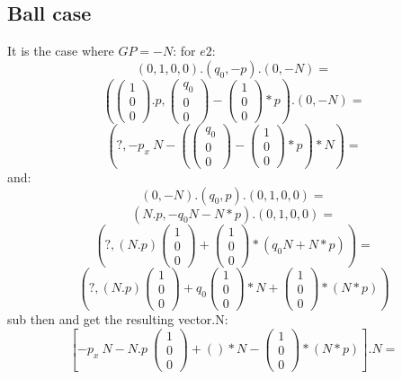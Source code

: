 \subsection{Ball case}
It is the case where $GP=-N$:
for $e2$:
\[(0,1,0,0).(q_0,-p).(0,-N)=\]
\[\left(\left(\begin{array}{c}1\\0\\0\end{array}\right).p,\left(\begin{array}{c}q_0\\0\\0\end{array}\right) -\left(\begin{array}{c}1\\0\\0\end{array}\right)*p \right).(0,-N)=\]
\[\left(?, -p_x~N-\left(\left(\begin{array}{c}q_0\\0\\0\end{array}\right)- \left(\begin{array}{c}1\\0\\0\end{array}\right)*p \right)*N\right)=\]
and:
\[(0,-N).(q_0,p).(0,1,0,0)=\]
\[(N.p,-q_0N-N*p).(0,1,0,0)=\]
\[\left(?,(N.p)\left(\begin{array}{c}1\\0\\0\end{array}\right) + \left(\begin{array}{c}1\\0\\0\end{array}\right)*(q_0N+N*p)\right)=\]
\[\left(?,(N.p)\left(\begin{array}{c}1\\0\\0\end{array}\right)+q_0 \left(\begin{array}{c}1\\0\\0\end{array}\right)*N+\left(\begin{array}{c}1\\0\\0\end{array}\right)*(N*p)\right)\]
sub then and get the resulting vector.N:
\[\left[ -p_x~N -N.p~\left(\begin{array}{c}1\\0\\0\end{array}\right)+()*N-\left(\begin{array}{c}1\\0\\0\end{array}\right)*(N*p)\right].N=\]
